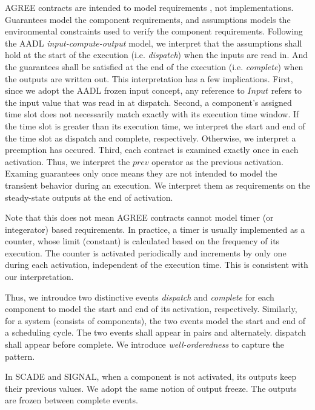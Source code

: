AGREE contracts are intended to model requirements \cite{AGREE2}, not implementations. Guarantees model the component requirements, and assumptions models the environmental constraints used to verify the component requirements. Following the AADL \emph{input-compute-output} model, we interpret that the assumptions shall hold at the start of the execution (i.e. \emph{dispatch}) when the inputs are read in. And the guarantees shall be satisfied at the end of the execution (i.e. \emph{complete}) when the outputs are written out. This interpretation has a few implications. 
First, since we adopt the AADL frozen input concept, any reference to $Input$ refers to the input value that was read in at dispatch.
Second, a component's assigned time slot does not necessarily match exactly with its execution time window. If the time slot is greater than its execution time, we interpret the start and end of the time slot as dispatch and complete, respectively. Otherwise, we interpret a preemption has occured.
Third, each contract is examined exactly once in each activation. Thus, we interpret the $prev$ operator as the previous activation. 
Examing guarantees only once means they are not intended to model the transient behavior during an execution. We interpret them as requirements on the steady-state outputs at the end of activation.

Note that this does not mean AGREE contracts cannot model timer (or integerator) based requirements. In practice, a timer is usually implemented as a counter, whose limit (constant) is calculated based on the frequency of its execution. The counter is activated periodically and increments by only one during each activation, independent of the execution time. This is consistent with our interpretation.

Thus, we introudce two distinctive events \emph{dispatch} and \emph{complete} for each component to model the start and end of its activation, respectively. 
Similarly, for a system (consists of components), the two events model the start and end of a scheduling cycle. 
The two events shall appear in pairs and alternately. dispatch shall appear before complete. We introduce \emph{well-orderedness} to capture the pattern.

In SCADE and SIGNAL, when a component is not activated, its outputs keep their previous values. We adopt the same notion of output freeze. The outputs are frozen between complete events. 

